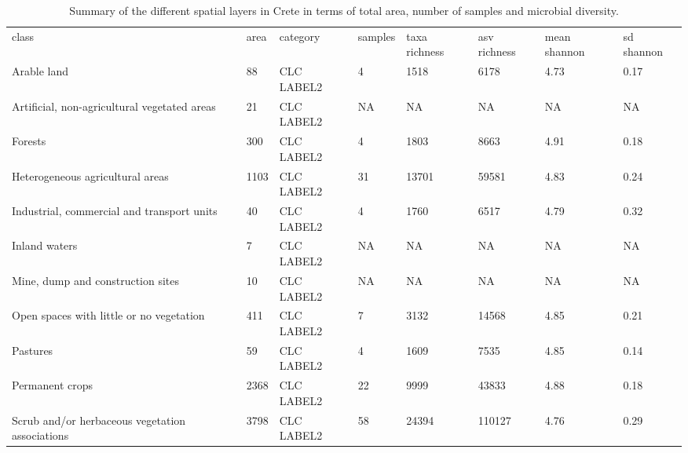 \begin{sidewaystable*}
    \caption{Summary of the different spatial layers in Crete in terms of total area, number of samples and microbial diversity.\label{table:data_cube_summary}}
\begin{tabular*}{\textwidth}{@{\extracolsep{\fill}}llllllll@{\extracolsep{\fill}}}
\tabcolsep=0pt%
class                                           & area & category             & samples & taxa richness & asv richness & mean shannon & sd shannon \\
Arable land                                     & 88   & CLC LABEL2           & 4       & 1518           & 6178          & 4.73          & 0.17        \\
Artificial, non-agricultural vegetated areas    & 21   & CLC LABEL2           & NA      & NA             & NA            & NA            & NA          \\
Forests                                         & 300  & CLC LABEL2           & 4       & 1803           & 8663          & 4.91          & 0.18        \\
Heterogeneous agricultural areas                & 1103 & CLC LABEL2           & 31      & 13701          & 59581         & 4.83          & 0.24        \\
Industrial, commercial and transport units      & 40   & CLC LABEL2           & 4       & 1760           & 6517          & 4.79          & 0.32        \\
Inland waters                                   & 7    & CLC LABEL2           & NA      & NA             & NA            & NA            & NA          \\
Mine, dump and construction sites               & 10   & CLC LABEL2           & NA      & NA             & NA            & NA            & NA          \\
Open spaces with little or no vegetation        & 411  & CLC LABEL2           & 7       & 3132           & 14568         & 4.85          & 0.21        \\
Pastures                                        & 59   & CLC LABEL2           & 4       & 1609           & 7535          & 4.85          & 0.14        \\
Permanent crops                                 & 2368 & CLC LABEL2           & 22      & 9999           & 43833         & 4.88          & 0.18        \\
Scrub and/or herbaceous vegetation associations & 3798 & CLC LABEL2           & 58      & 24394          & 110127        & 4.76          & 0.29        \\

\end{tabular*}
\end{sidewaystable*}
